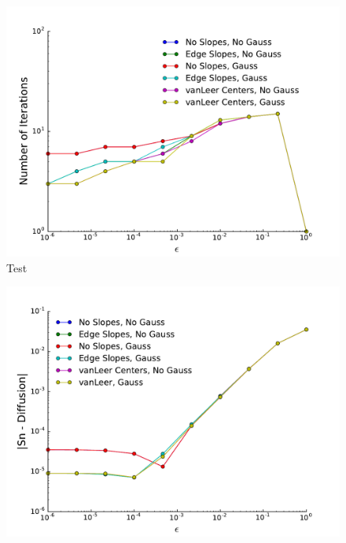 \begin{figure} \centering
	\includegraphics[width=5in]{figs/diffLimit.pdf}
	\caption{Test}
	\label{fig:diffLim_iterations}
\end{figure}
\begin{figure} \centering
	\includegraphics[width=6in]{figs/diffError.pdf}
	\caption{}
	\label{fig:diffLim_error}
\end{figure}

